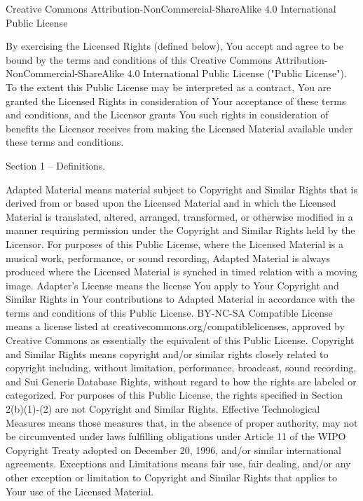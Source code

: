 Creative Commons Attribution-NonCommercial-ShareAlike 4.0 International Public License

\scriptsize {
By exercising the Licensed Rights (defined below), You accept and agree to be bound by the terms and conditions of this Creative Commons Attribution-NonCommercial-ShareAlike 4.0 International Public License ("Public License"). To the extent this Public License may be interpreted as a contract, You are granted the Licensed Rights in consideration of Your acceptance of these terms and conditions, and the Licensor grants You such rights in consideration of benefits the Licensor receives from making the Licensed Material available under these terms and conditions.

Section 1 – Definitions.

    Adapted Material means material subject to Copyright and Similar Rights that is derived from or based upon the Licensed Material and in which the Licensed Material is translated, altered, arranged, transformed, or otherwise modified in a manner requiring permission under the Copyright and Similar Rights held by the Licensor. For purposes of this Public License, where the Licensed Material is a musical work, performance, or sound recording, Adapted Material is always produced where the Licensed Material is synched in timed relation with a moving image.
    Adapter's License means the license You apply to Your Copyright and Similar Rights in Your contributions to Adapted Material in accordance with the terms and conditions of this Public License.
    BY-NC-SA Compatible License means a license listed at creativecommons.org/compatiblelicenses, approved by Creative Commons as essentially the equivalent of this Public License.
    Copyright and Similar Rights means copyright and/or similar rights closely related to copyright including, without limitation, performance, broadcast, sound recording, and Sui Generis Database Rights, without regard to how the rights are labeled or categorized. For purposes of this Public License, the rights specified in Section 2(b)(1)-(2) are not Copyright and Similar Rights.
    Effective Technological Measures means those measures that, in the absence of proper authority, may not be circumvented under laws fulfilling obligations under Article 11 of the WIPO Copyright Treaty adopted on December 20, 1996, and/or similar international agreements.
    Exceptions and Limitations means fair use, fair dealing, and/or any other exception or limitation to Copyright and Similar Rights that applies to Your use of the Licensed Material.
}
